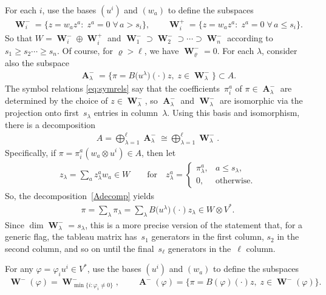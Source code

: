 \documentclass[pdftex]{sigma}
\numberwithin{equation}{section}
\DeclareMathOperator{\Au}{\mathbf{A}}
\DeclareMathOperator{\Wu}{\mathbf{W}}
\begin{document}
For each $i$, use the bases $(u^i)$ and $(w_a)$ to def\/ine the subspaces
\begin{gather*}
\Wu^-_i = \big\{ z =w_a z^a\colon \; z^a = 0\; \forall\, a > s_i \big\}, \qquad
\Wu^+_i = \big\{ z =w_a z^a\colon \;  z^a = 0\; \forall\, a \leq s_i \big\}.
\end{gather*}
So that $W =  \Wu^-_i \oplus \Wu^+_i$ and $\Wu^-_1 \supset
\Wu^-_2 \supset \cdots \supset \Wu^-_n$ according to $s_1 \geq s_2
\cdots \geq s_n$.  Of course, for $\varrho > \ell$, we have
$\Wu^-_\varrho = 0$.  For each $\lambda$, consider also the subspace
\begin{gather*}
\Au^-_\lambda = \big\{ \pi = B\big(u^\lambda\big)(\cdot)z,\; z \in \Wu^-_\lambda\big\} \subset
A.
\end{gather*}
The symbol relations \eqref{eq:symrels} say that the coef\/f\/icients~$\pi^a_i$ of
$\pi \in \Au^-_\lambda$ are
determined by the choice of $z \in \Wu^-_\lambda$, so
$\Au^-_\lambda$ and $\Wu^-_\lambda$ are isomorphic
via the projection onto f\/irst~$s_\lambda$ entries in column~$\lambda$.
Using this basis and isomorphism, there is a decomposition
\begin{gather}
A = \bigoplus_{\lambda=1}^\ell \Au^-_\lambda \cong \bigoplus_{\lambda=1}^\ell
\Wu^-_\lambda.
\label{Adecomp}
\end{gather}
Specif\/ically, if $\pi = \pi^a_i (w_a \otimes u^i) \in A$, then let
\begin{gather*}
z_\lambda = \sum_a z^a_\lambda w_a \in W \qquad \text{for} \quad z^a_\lambda =
\begin{cases}
\pi^a_\lambda,& a \leq s_\lambda,\\
0, & \text{otherwise}.
\end{cases}
\label{zdecomp}
\end{gather*}
So, the decomposition~\eqref{Adecomp} yields
\begin{gather*}
\pi = \sum_\lambda \pi_\lambda = \sum_\lambda B\big(u^\lambda\big)(\cdot)z_\lambda \in
W \otimes V^*.
\end{gather*}
Since $\dim \Wu^-_\lambda = s_\lambda$, this is a more precise version of the statement
that, for a generic f\/lag, the tableau matrix has~$s_1$ generators in the f\/irst
column, $s_2$ in the second column, and so on until the f\/inal~$s_\ell$
generators in the~$\ell$ column.

For any $\varphi = \varphi_i u^i \in V^*$, use the bases $(u^i)$ and $(w_a)$ to def\/ine the subspaces
\begin{gather*}
\Wu^-(\varphi)  = \Wu^-_{\min\{i\colon  \varphi_i \neq 0\}},\qquad
\Au^-(\varphi)  = \big\{ \pi = B(\varphi)(\cdot)z,\; z \in \Wu^-(\varphi)\big\}.
\end{gather*}
\end{document}
